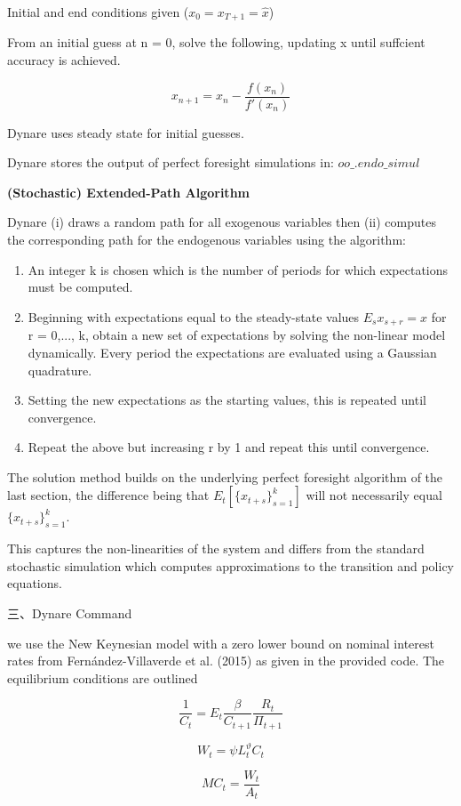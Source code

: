 \documentclass[10pt,math=newtx,citestyle=gb7714-2015,bibstyle=gb7714-2015]{elegantbook}
\begin{document}
{Initial and end conditions given ($x_0 = x_{T+1}= \hat{x}$)

From an initial guess at n = 0, solve the following, updating x until suffcient accuracy is achieved.

$$x_{n+1}=x_n-\frac{f(x_n)}{f'(x_n)}$$

Dynare uses steady state for initial guesses.

Dynare stores the output of perfect foresight simulations in: $oo\_.endo\_simul$

\textbf{(Stochastic) Extended-Path Algorithm}

Dynare (i) draws a random path for all exogenous variables then (ii) computes the corresponding path for the endogenous variables using the algorithm:

\begin{enumerate}
	\item An integer k is chosen which is the number of periods for which expectations must be computed.
	\item Beginning with expectations equal to the steady-state values $E_sx_{s+r} = x$ for r = 0,..., k, obtain a new set of expectations by solving the non-linear model dynamically. Every period the expectations are evaluated using a Gaussian quadrature.
	\item Setting the new expectations as the starting values, this is repeated until convergence.
	\item Repeat the above but increasing r by 1 and repeat this until convergence.
\end{enumerate}

The solution method builds on the underlying perfect foresight algorithm of the last section, the difference being that $E_t\left[\{x_{t+s}\}_{s=1}^k\right]$ will not necessarily equal $\{x_{t+s}\}_{s=1}^k$.

This captures the non-linearities of the system and differs from the standard stochastic simulation which computes approximations to the transition and policy equations.

三、Dynare Command

we use the New Keynesian model with a zero lower bound on nominal interest rates from Fernández-Villaverde et al. (2015) as given in the provided code. The equilibrium conditions are outlined

$$\frac{1}{C_t}=E_t\frac{\beta}{C_{t+1}}\frac{R_t}{\Pi_{t+1}}$$

$$W_t=\psi L_t^{\vartheta}C_t$$

$$MC_t=\frac{W_t}{A_t}$$

}
\end{document}
